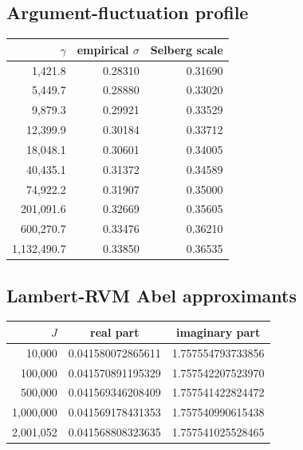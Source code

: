 \documentclass[11pt]{amsart}
\numberwithin{equation}{section}
\theoremstyle{definition}
\theoremstyle{remark}
\begin{document}
\subsection{Argument-fluctuation profile}\label{subsec:annex_argument_profile}
\begin{center}
\small
\begin{tabular}{rrr}
\toprule
$\gamma$ & empirical $\sigma$ & Selberg scale\\
\midrule
1,421.8 & 0.28310 & 0.31690\\
5,449.7 & 0.28880 & 0.33020\\
9,879.3 & 0.29921 & 0.33529\\
12,399.9 & 0.30184 & 0.33712\\
18,048.1 & 0.30601 & 0.34005\\
40,435.1 & 0.31372 & 0.34589\\
74,922.2 & 0.31907 & 0.35000\\
201,091.6 & 0.32669 & 0.35605\\
600,270.7 & 0.33476 & 0.36210\\
1,132,490.7 & 0.33850 & 0.36535\\
\bottomrule
\end{tabular}
\end{center}

\subsection{Lambert-RVM Abel approximants}\label{subsec:annex_rvm_abel}
\begin{center}
\small
\begin{tabular}{rcc}
\toprule
$J$ & real part & imaginary part\\
\midrule
10,000 & 0.041580072865611 & 1.757554793733856\\
100,000 & 0.041570891195329 & 1.757542207523970\\
500,000 & 0.041569346208409 & 1.757541422824472\\
1,000,000 & 0.041569178431353 & 1.757540990615438\\
2,001,052 & 0.041568808323635 & 1.757541025528465\\
\bottomrule
\end{tabular}
\end{center}
\end{document}
